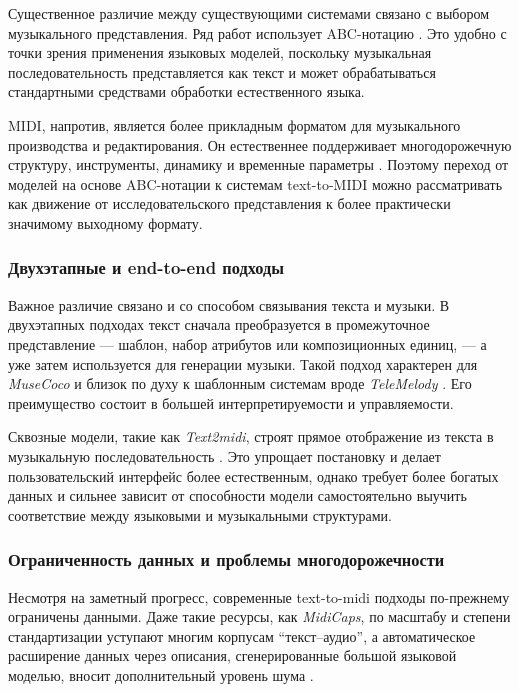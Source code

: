 \documentclass[a4paper,12pt]{extarticle}
\begin{document}
Существенное различие между существующими системами связано с выбором
музыкального представления. Ряд работ использует ABC-нотацию
\cite{wu2022texttomusic,yuan2024chatmusician}. Это удобно с точки зрения
применения языковых моделей, поскольку музыкальная последовательность
представляется как текст и может обрабатываться стандартными средствами
обработки естественного языка.

MIDI, напротив, является более прикладным форматом для музыкального
производства и редактирования. Он естественнее поддерживает
многодорожечную структуру, инструменты, динамику и временные параметры
\cite{melechovsky2024midicaps,bhandari2025text2midi}. Поэтому переход от
моделей на основе ABC-нотации к системам text-to-MIDI можно
рассматривать как движение от исследовательского представления к более
практически значимому выходному формату.

\subsubsection{Двухэтапные и end-to-end подходы}

Важное различие связано и со способом связывания текста и музыки. В
двухэтапных подходах текст сначала преобразуется в промежуточное
представление --- шаблон, набор атрибутов или композиционных единиц, ---
а уже затем используется для генерации музыки. Такой подход характерен
для \textit{MuseCoco} и близок по духу к шаблонным системам вроде
\textit{TeleMelody} \cite{lu2023musecoco,ju2022telemelody}. Его
преимущество состоит в большей интерпретируемости и управляемости.

Сквозные модели, такие как \textit{Text2midi}, строят прямое отображение
из текста в музыкальную последовательность \cite{bhandari2025text2midi}.
Это упрощает постановку и делает пользовательский интерфейс более
естественным, однако требует более богатых данных и сильнее зависит от
способности модели самостоятельно выучить соответствие между языковыми и
музыкальными структурами.

\subsubsection{Ограниченность данных и проблемы многодорожечности}

Несмотря на заметный прогресс, современные text-to-midi подходы
по-прежнему ограничены данными. Даже такие ресурсы, как \textit{MidiCaps},
по масштабу и степени стандартизации уступают многим корпусам
``текст--аудио'', а автоматическое расширение данных через описания,
сгенерированные большой языковой моделью, вносит дополнительный уровень
шума \cite{melechovsky2024midicaps,xu2025metascore}.
\end{document}
